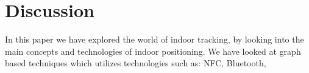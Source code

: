 \section{Discussion}
In this paper we have explored the world of indoor tracking, by looking into the main concepts and technologies of indoor positioning. 
We have looked at graph based techniques which utilizes technologies such as: NFC, Bluetooth, 